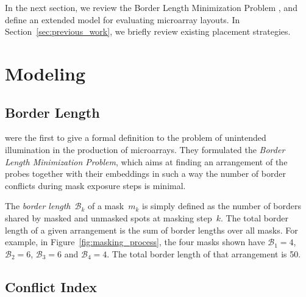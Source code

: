 \documentclass{llncs}
\begin{document}
In the next section, we review the Border Length Minimization Problem
\cite{HANNENHALLI02}, and define an extended model for evaluating microarray
layouts. In Section~\ref{sec:previous_work}, we briefly review existing
placement strategies.

\section{Modeling}
\label{sec:model}

\subsection{Border Length}

\cite{HANNENHALLI02} were the first to give a formal definition to the problem
of unintended illumination in the production of microarrays. They formulated the
\emph{Border Length Minimization Problem}, which aims at finding an arrangement
of the probes together with their embeddings in such a way the number of border
conflicts during mask exposure steps is minimal.

The \emph{border length}~$\mathcal{B}_k$ of a mask~$m_{k}$ is simply
defined as the number of borders shared by masked and unmasked spots
at masking step~$k$. The total border length of a given arrangement is
the sum of border lengths over all masks. For example, in
Figure~\ref{fig:masking_process}, the four masks shown have
$\mathcal{B}_1 = 4$, $\mathcal{B}_2 = 6$, $\mathcal{B}_3 = 6$ and $\mathcal{B}_4 = 4$.
The total border length of that arrangement is 50.

\subsection{Conflict Index}
\end{document}
